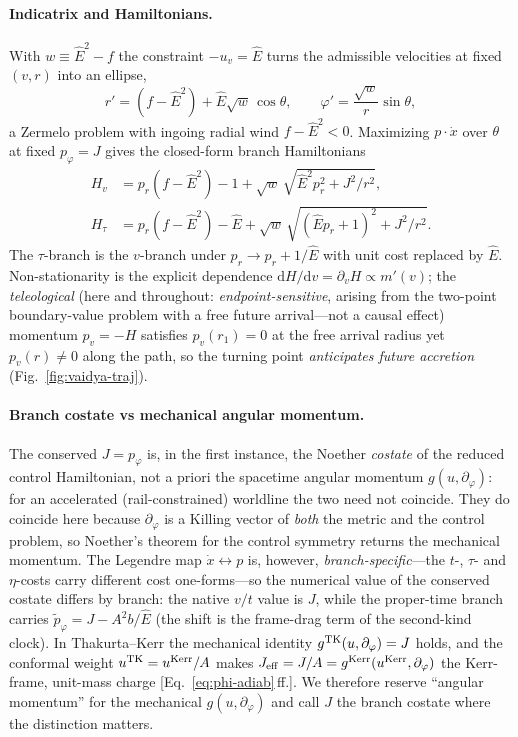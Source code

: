 \documentclass[12pt]{iopart}
\newcommand{\Ehat}{\hat E}
\newcommand{\dd}{\mathrm{d}}
\begin{document}
\paragraph{Indicatrix and Hamiltonians.} With $w\equiv\Ehat^2-f$ the constraint
$-u_v=\Ehat$ turns the admissible velocities at fixed $(v,r)$ into an ellipse,
\begin{equation}
    r'=(f-\Ehat^2)+\Ehat\sqrt w\,\cos\theta,\qquad
    \varphi'=\frac{\sqrt w}{r}\sin\theta,
    \label{eq:vaidya-ind}
\end{equation}
a Zermelo problem with ingoing radial wind $f-\Ehat^2<0$. Maximizing
$p\cdot\dot x$ over $\theta$ at fixed $p_\varphi=J$ gives the closed-form branch
Hamiltonians
\begin{align}
    H_v&=p_r(f-\Ehat^2)-1+\sqrt w\,\sqrt{\Ehat^2 p_r^2+J^2/r^2},
    \label{eq:Hv}\\
    H_\tau&=p_r(f-\Ehat^2)-\Ehat
        +\sqrt w\,\sqrt{(\Ehat p_r+1)^2+J^2/r^2}.
    \label{eq:Htau-vaidya}
\end{align}
The $\tau$-branch is the $v$-branch under $p_r\to p_r+1/\Ehat$ with unit cost
replaced by $\Ehat$. Non-stationarity is the explicit dependence
$\dd H/\dd v=\partial_v H\propto m'(v)$; the \emph{teleological} (here and
throughout: \emph{endpoint-sensitive}, arising from the two-point boundary-value
problem with a free future arrival---not a causal effect) momentum $p_v=-H$
satisfies $p_v(r_1)=0$ at the free arrival radius yet $p_v(r)\neq0$ along the
path, so the turning point \emph{anticipates future accretion}
(Fig.~\ref{fig:vaidya-traj}).

\paragraph{Branch costate vs mechanical angular momentum.} The conserved $J=p_\varphi$
is, in the first instance, the Noether \emph{costate} of the reduced control
Hamiltonian, not a priori the spacetime angular momentum $g(u,\partial_\varphi)$: for
an accelerated (rail-constrained) worldline the two need not coincide. They do coincide
here because $\partial_\varphi$ is a Killing vector of \emph{both} the metric and the
control problem, so Noether's theorem for the control symmetry returns the mechanical
momentum. The Legendre map $\dot x\!\leftrightarrow\!p$ is, however,
\emph{branch-specific}---the $t$-, $\tau$- and $\eta$-costs carry different cost
one-forms---so the numerical value of the conserved costate differs by branch: the
native $v/t$ value is $J$, while the proper-time branch carries
$\tilde p_\varphi=J-A^2b/\Ehat$ (the shift is the frame-drag term of the second-kind
clock). In Thakurta--Kerr the mechanical identity $g^{\rm TK}(u,\partial_\varphi)=J$
holds, and the conformal weight $u^{\rm TK}=u^{\rm Kerr}/A$ makes
$J_{\rm eff}=J/A=g^{\rm Kerr}(u^{\rm Kerr},\partial_\varphi)$ the Kerr-frame,
unit-mass charge [Eq.~\eqref{eq:phi-adiab}\,ff.]. We therefore reserve
``angular momentum'' for the mechanical $g(u,\partial_\varphi)$ and call $J$ the
branch costate where the distinction matters.
\end{document}
